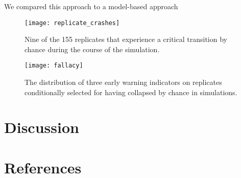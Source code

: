 \documentclass[authoryear,preprint,11pt]{elsarticle}
\begin{document}
We compared this approach to a model-based approach 


  \begin{figure}[ht]
    \begin{center}
      \texttt{[image: replicate\_crashes]}
    \end{center}
    \caption{Nine of the 155 replicates that experience a critical transition by chance during the course of the simulation.}
    \label{fig:replicate_crashes}
  \end{figure}


  \begin{figure}[ht]
    \begin{center}
      \texttt{[image: fallacy]}
    \end{center}
    \caption{The distribution of three early warning indicators on replicates conditionally selected for having collapsed by chance in simulations.}
    \label{fig:indicator}
  \end{figure}

 \section{Discussion}

 \section{References}%
 
 
\end{document}
